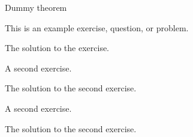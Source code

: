 \begin{theorem}
Dummy theorem
\end{theorem}

\begin{exercise}
    This is an example exercise, question, or problem.
\end{exercise}

\begin{solution}
    The solution to the exercise.
\end{solution}


\begin{exercise}
    A second exercise.
\end{exercise}

\begin{solution}
    The solution to the second exercise.
\end{solution}


\begin{exercise}
    A second exercise.
\end{exercise}

\begin{solution}
    The solution to the second exercise.
\end{solution}
